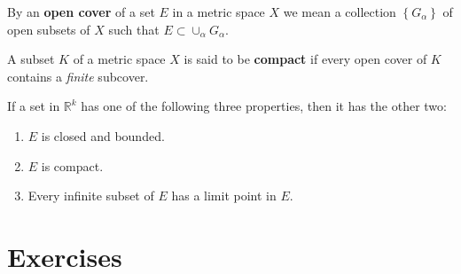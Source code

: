 \setcounter{theorem}{30}
\begin{definition}
	\label{theorem-2.31}
	By an \textbf{\gls{open cover}} of a set $E$ in a metric space $X$ we mean a collection $\left\lbrace G_\alpha \right\rbrace$ of open subsets of $X$ such that $E \subset \cup_\alpha G_\alpha$.
\end{definition}

\begin{definition}
	A subset $K$ of a metric space $X$ is said to be \textbf{\gls{compact}} if every open cover of $K$ contains a \textit{finite} subcover.
\end{definition}

\setcounter{theorem}{40}
\begin{theorem}
	\label{theorem-2.41}
	If a set in $\mathbb{R}^k$ has one of the following three properties, then it has the other two:
	\renewcommand{\labelenumi}{(\alph{enumi})}
	\begin{enumerate}
		\item $E$ is closed and bounded.
		\item $E$ is compact.
		\item Every infinite subset of $E$ has a limit point in $E$.
	\end{enumerate}
\end{theorem}

\section{Exercises}







